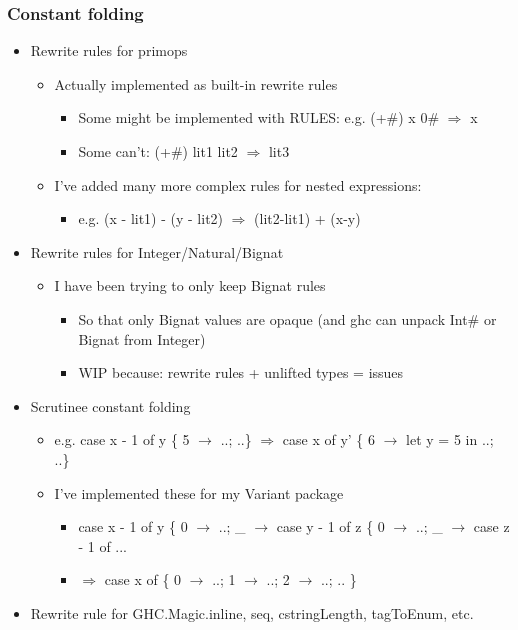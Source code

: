 \documentclass[aspectratio=169]{beamer}
\begin{document}
\begin{frame}
  \frametitle{Constant folding}
  \begin{itemize}
    \item Rewrite rules for primops
      \begin{itemize}
    \item Actually implemented as built-in rewrite rules
      \begin{itemize}
    \item Some might be implemented with RULES: e.g. (+\#) x 0\#
      $\Longrightarrow$ x
    \item Some can't: (+\#) lit1 lit2 $\Longrightarrow$ lit3
      \end{itemize}
    \item I've added many more complex rules for nested expressions:
      \begin{itemize}
        \item e.g. (x - lit1) - (y - lit2) $\Longrightarrow$ (lit2-lit1) + (x-y)
      \end{itemize}
      \end{itemize}
    \pause
    \item Rewrite rules for Integer/Natural/Bignat
      \begin{itemize}
        \item I have been trying to only keep Bignat rules
          \begin{itemize}
        \item So that only Bignat values are opaque (and ghc can unpack Int\# or
          Bignat from Integer)
        \item WIP because: rewrite rules + unlifted types = issues
          \end{itemize}
      \end{itemize}
    \pause
    \item Scrutinee constant folding
      \begin{itemize}
        \item e.g. case x - 1 of y \{ 5 $\rightarrow$ ..; ..\}
          $\Longrightarrow$ case x of
          y' \{ 6 $\rightarrow$ let y = 5 in ..; ..\}
        \item I've implemented these for my Variant package
          \begin{itemize}
            \item case x - 1 of y \{ 0 $\rightarrow$ ..; \_ $\rightarrow$ case
              y - 1 of z \{ 0
              $\rightarrow$ ..; \_ $\rightarrow$ case z - 1 of ... 
            \item $\Longrightarrow$ case x of \{ 0 $\rightarrow$ ..; 1
              $\rightarrow$ ..; 2 $\rightarrow$ ..; .. \}
          \end{itemize}
      \end{itemize}
    \pause
    \item Rewrite rule for GHC.Magic.inline, seq, cstringLength,
      tagToEnum, etc.
  \end{itemize}


\end{frame}
\end{document}
